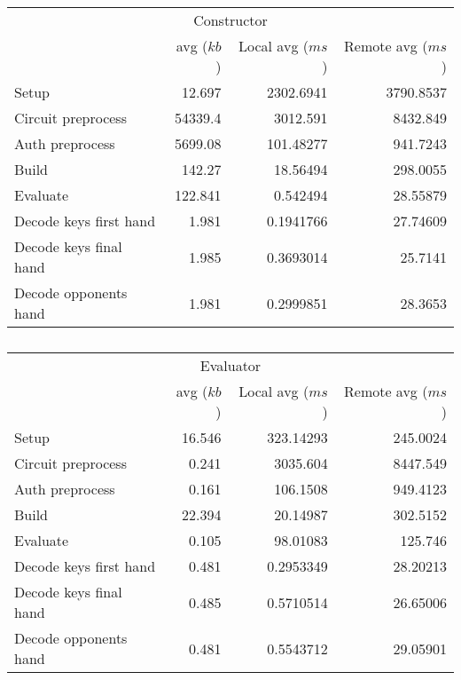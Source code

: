 \begin{table}[!htb]
\label{mesurement_table}
\centering

\begin{subtable}{\textwidth}
\begin{tabular}{l ||r r r}
\multicolumn{4}{c}{Constructor} \\
    & avg ($kb$) & Local avg ($ms$) & Remote avg ($ms$)    \\
\hline
Setup                  &    12.697 & 2302.6941    & 3790.8537  \\
Circuit preprocess     & 54339.4   & 3012.591     & 8432.849   \\
Auth preprocess        &  5699.08  &  101.48277   &  941.7243  \\
Build                  &   142.27  &   18.56494   &  298.0055  \\
Evaluate               &   122.841 &    0.542494  &   28.55879 \\
Decode keys first hand &     1.981 &    0.1941766 &   27.74609 \\
Decode keys final hand &     1.985 &    0.3693014 &   25.7141  \\
Decode opponents hand  &     1.981 &    0.2999851 &   28.3653
\end{tabular}
\caption{}
\end{subtable}%

\begin{subtable}{\textwidth}
\begin{tabular}{l ||r r r}
\multicolumn{4}{c}{Evaluator} \\
    & avg ($kb$) & Local avg ($ms$) & Remote avg ($ms$)    \\
\hline
Setup                  & 16.546 &  323.14293   &  245.0024  \\
Circuit preprocess     &  0.241 & 3035.604     & 8447.549   \\
Auth preprocess        &  0.161 &  106.1508    &  949.4123  \\
Build                  & 22.394 &   20.14987   &  302.5152  \\
Evaluate               &  0.105 &   98.01083   &  125.746   \\
Decode keys first hand &  0.481 &    0.2953349 &   28.20213 \\
Decode keys final hand &  0.485 &    0.5710514 &   26.65006 \\
Decode opponents hand  &  0.481 &    0.5543712 &   29.05901
\end{tabular}
\caption{}
\end{subtable}

\caption{}
\end{table}